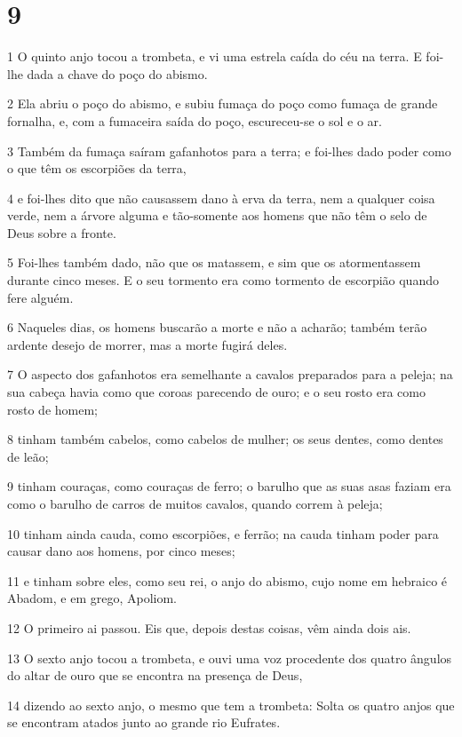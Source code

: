 \chapter{9}

\par 1 O quinto anjo tocou a trombeta, e vi uma estrela caída do céu na terra. E foi-lhe dada a chave do poço do abismo.
\par 2 Ela abriu o poço do abismo, e subiu fumaça do poço como fumaça de grande fornalha, e, com a fumaceira saída do poço, escureceu-se o sol e o ar.
\par 3 Também da fumaça saíram gafanhotos para a terra; e foi-lhes dado poder como o que têm os escorpiões da terra,
\par 4 e foi-lhes dito que não causassem dano à erva da terra, nem a qualquer coisa verde, nem a árvore alguma e tão-somente aos homens que não têm o selo de Deus sobre a fronte.
\par 5 Foi-lhes também dado, não que os matassem, e sim que os atormentassem durante cinco meses. E o seu tormento era como tormento de escorpião quando fere alguém.
\par 6 Naqueles dias, os homens buscarão a morte e não a acharão; também terão ardente desejo de morrer, mas a morte fugirá deles.
\par 7 O aspecto dos gafanhotos era semelhante a cavalos preparados para a peleja; na sua cabeça havia como que coroas parecendo de ouro; e o seu rosto era como rosto de homem;
\par 8 tinham também cabelos, como cabelos de mulher; os seus dentes, como dentes de leão;
\par 9 tinham couraças, como couraças de ferro; o barulho que as suas asas faziam era como o barulho de carros de muitos cavalos, quando correm à peleja;
\par 10 tinham ainda cauda, como escorpiões, e ferrão; na cauda tinham poder para causar dano aos homens, por cinco meses;
\par 11 e tinham sobre eles, como seu rei, o anjo do abismo, cujo nome em hebraico é Abadom, e em grego, Apoliom.
\par 12 O primeiro ai passou. Eis que, depois destas coisas, vêm ainda dois ais.
\par 13 O sexto anjo tocou a trombeta, e ouvi uma voz procedente dos quatro ângulos do altar de ouro que se encontra na presença de Deus,
\par 14 dizendo ao sexto anjo, o mesmo que tem a trombeta: Solta os quatro anjos que se encontram atados junto ao grande rio Eufrates.
